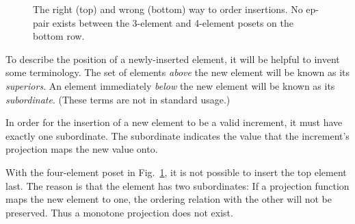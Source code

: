 \begin{figure}
\begin{center}
\end{center}
\caption{The right (top) and wrong (bottom) way to order insertions. No ep-pair exists between the 3-element and 4-element posets on the bottom row.}
\label{fig:order}
\end{figure}

To describe the position of a newly-inserted element, it will be helpful to invent some terminology. The set of elements \emph{above} the new element will be known as its \emph{superiors}. An element immediately \emph{below} the new element will be known as its \emph{subordinate}. (These terms are not in standard usage.)

In order for the insertion of a new element to be a valid increment, it must have exactly one subordinate. The subordinate indicates the value that the increment's projection maps the new value onto.

With the four-element poset in Fig.~\ref{fig:order}, it is not possible to insert the top element last. The reason is that the element has two subordinates: If a projection function maps the new element to one, the ordering relation with the other will not be preserved. Thus a monotone projection does not exist.

